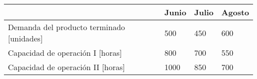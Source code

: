 \begin{table}[H]
\centering
\begin{tabular}{llll}
\hline
                                              & Junio & Julio & Agosto \\\hline
Demanda del producto terminado {[}unidades{]} & 500   & 450   & 600    \\
Capacidad de operación I {[}horas{]}          & 800   & 700   & 550    \\
Capacidad de operación II {[}horas{]}         & 1000  & 850   & 700   \\ \hline
\end{tabular}
\end{table}

